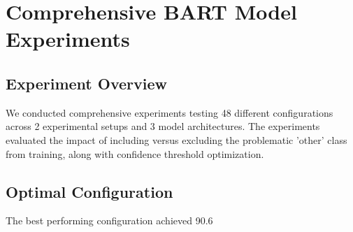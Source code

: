\section{Comprehensive BART Model Experiments}

\subsection{Experiment Overview}
We conducted comprehensive experiments testing 48 different configurations across 2 experimental setups and 3 model architectures. The experiments evaluated the impact of including versus excluding the problematic 'other' class from training, along with confidence threshold optimization.

\subsection{Optimal Configuration}
The best performing configuration achieved 90.6%

